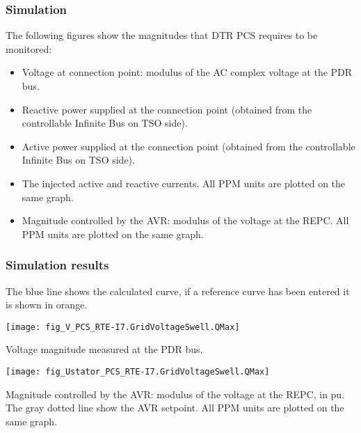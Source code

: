     \subsubsection{Simulation}
    The following figures show the magnitudes that DTR PCS \DTRPcs
    requires to be monitored:
    \begin{itemize}
        \item Voltage at connection point: modulus of the AC complex voltage at
        the PDR bus.
        \item Reactive power supplied at the connection point (obtained from
        the controllable Infinite Bus on TSO side).
        \item Active power supplied at the connection point (obtained from
        the controllable Infinite Bus on TSO side).
        \item The injected active and reactive currents. All PPM
        units are plotted on the same graph.
        \item Magnitude controlled by the AVR: modulus of the voltage at the REPC.
        All PPM units are plotted on the same graph.
    \end{itemize}

    \subsubsection{Simulation results}
    The blue line shows the calculated curve, if a reference curve has been entered it is
    shown in orange.

    \noindent
    \begin{minipage}[t]{0.48\textwidth}
        \centering
        \texttt{[image: fig\_V\_PCS\_RTE-I7.GridVoltageSwell.QMax]}
        \begin{minipage}[t]{0.8\textwidth}
            \small Voltage magnitude measured at the PDR bus.
        \end{minipage}
    \end{minipage}
    \hfill
        \begin{minipage}[t]{0.48\textwidth}
            \centering
            \texttt{[image: fig\_Ustator\_PCS\_RTE-I7.GridVoltageSwell.QMax]}
            \begin{minipage}[t]{0.8\textwidth}
                \small Magnitude controlled by the AVR: modulus of the voltage at the REPC, in pu.
                The gray dotted line show the AVR setpoint. All PPM units are plotted on the same
                graph.
            \end{minipage}
        \end{minipage}

